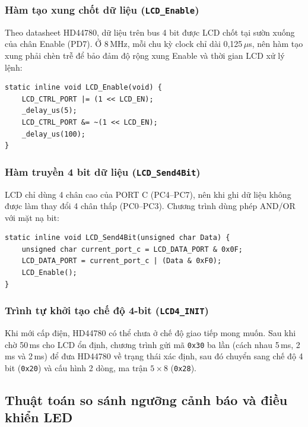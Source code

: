 \subsubsection{Hàm tạo xung chốt dữ liệu (\texttt{LCD\_Enable})}
Theo datasheet HD44780, dữ liệu trên bus 4 bit được LCD chốt tại sườn xuống của chân Enable (PD7). Ở 8\,MHz, mỗi chu kỳ clock chỉ dài 0,125\,$\mu$s, nên hàm tạo xung phải chèn trễ để bảo đảm độ rộng xung Enable và thời gian LCD xử lý lệnh:
\begin{verbatim}
static inline void LCD_Enable(void) {
    LCD_CTRL_PORT |= (1 << LCD_EN);
    _delay_us(5);
    LCD_CTRL_PORT &= ~(1 << LCD_EN);
    _delay_us(100);
}
\end{verbatim}

\subsubsection{Hàm truyền 4 bit dữ liệu (\texttt{LCD\_Send4Bit})}
LCD chỉ dùng 4 chân cao của PORT C (PC4--PC7), nên khi ghi dữ liệu không được làm thay đổi 4 chân thấp (PC0--PC3). Chương trình dùng phép AND/OR với mặt nạ bit:
\begin{verbatim}
static inline void LCD_Send4Bit(unsigned char Data) {
    unsigned char current_port_c = LCD_DATA_PORT & 0x0F;
    LCD_DATA_PORT = current_port_c | (Data & 0xF0);
    LCD_Enable();
}
\end{verbatim}

\subsubsection{Trình tự khởi tạo chế độ 4-bit (\texttt{LCD4\_INIT})}
Khi mới cấp điện, HD44780 có thể chưa ở chế độ giao tiếp mong muốn. Sau khi chờ 50\,ms cho LCD ổn định, chương trình gửi mã \texttt{0x30} ba lần (cách nhau 5\,ms, 2\,ms và 2\,ms) để đưa HD44780 về trạng thái xác định, sau đó chuyển sang chế độ 4 bit (\texttt{0x20}) và cấu hình 2 dòng, ma trận $5 \times 8$ (\texttt{0x28}).

\subsection{Thuật toán so sánh ngưỡng cảnh báo và điều khiển LED}
\label{sec:threshold}

